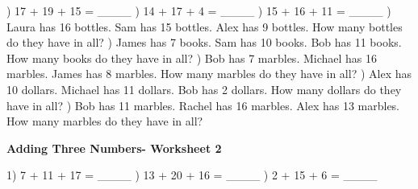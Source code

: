 \documentclass{article}%
\begin{document}
) 17 + 19 + 15 = \_\_\_\_%
\newline%
\newline%
) 14 + 17 + 4 = \_\_\_\_%
\newline%
\newline%
) 15 + 16 + 11 = \_\_\_\_%
\newline%
\newline%
) Laura has 16 bottles. Sam has 15 bottles. Alex has 9 bottles. How many bottles do they have in all?%
\newline%
\newline%
) James has 7 books. Sam has 10 books. Bob has 11 books. How many books do they have in all?%
\newline%
\newline%
) Bob has 7 marbles. Michael has 16 marbles. James has 8 marbles. How many marbles do they have in all?%
\newline%
\newline%
) Alex has 10 dollars. Michael has 11 dollars. Bob has 2 dollars. How many dollars do they have in all?%
\newline%
\newline%
) Bob has 11 marbles. Rachel has 16 marbles. Alex has 13 marbles. How many marbles do they have in all?%
\newline%
\newline%
\newline%
\pagebreak%
\large%
\begin{center}%
\textbf{Adding Three Numbers- Worksheet 2}%
\newline%
\end{center} \normalsize%
1) 7 + 11 + 17 = \_\_\_\_%
\newline%
\newline%
) 13 + 20 + 16 = \_\_\_\_%
\newline%
\newline%
) 2 + 15 + 6 = \_\_\_\_%
\newline%
\newline%
\newline%
\end{document}

